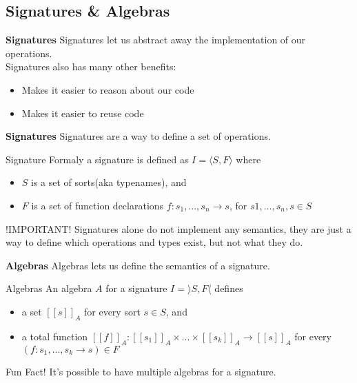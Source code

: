 \subsection*{Signatures \& Algebras}
\begin{frame}{\textbf{Signatures}}
    Signatures let us abstract away the implementation of our operations.\\
    Signatures also has many other benefits:
    \begin{itemize}
        \item Makes it easier to reason about our code
        \item Makes it easier to reuse code
    \end{itemize}
\end{frame}

\begin{frame}{\textbf{Signatures}}
    Signatures are a way to define a set of operations.\\
    \begin{block}{Signature}
        Formaly a signature is defined as $I = \langle S,F \rangle$ where
        \begin{itemize}
            \item $S$ is a set of sorts(aka typenames), and
            \item $F$ is a set of function declarations $f: s_1, ..., s_n \rightarrow s$, for $s1, \dots, s_n, s \in S$
        \end{itemize}
    \end{block}
    \begin{alertblock}{!IMPORTANT!}
        Signatures alone do not implement any semantics, they are just a way to define which operations and types exist, but not what they do.
    \end{alertblock}
\end{frame}

\begin{frame}{\textbf{Algebras}}
    Algebras lets us define the semantics of a signature.\\
    \begin{block}{Algebras}
        An algebra $A$ for a signature $I = \rangle S,F \langle$ defines
        \begin{itemize}
            \item a set $[\![s]\!]_A$ for every sort $s \in S$, and
            \item a total function $[\![f]\!]_A : [\![s_1]\!]_A \times ... \times [\![s_k]\!]_A \rightarrow [\![s]\!]_A$ for every  $(f: s_1, ... , s_k \rightarrow s) \in F$
        \end{itemize}
    \end{block}
    \begin{alertblock}{Fun Fact!}
        It's possible to have multiple algebras for a signature.
    \end{alertblock}
\end{frame}

